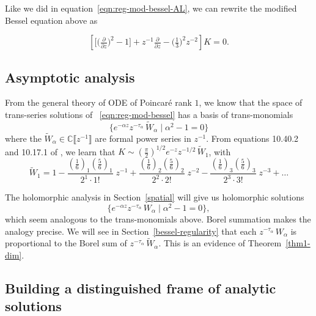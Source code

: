 \documentclass{article}
\theoremstyle{definition}
\newcommand{\C}{\mathbb{C}}
\newcommand{\series}[1]{\tilde{#1}}
\begin{document}
Like we did in equation~\eqref{eqn:reg-mod-bessel-AL}, we can rewrite the modified Bessel equation above as 

\begin{equation}\label{eqn:reg-mod-bessel}
\left[ \big[ \big(\tfrac{\partial}{\partial z}\big)^2 - 1 \big] + z^{-1} \tfrac{\partial}{\partial z} - \big(\tfrac{1}{3}\big)^2 z^{-2} \right] K = 0.
\end{equation}

\subsection{Asymptotic analysis}
From the general theory of ODE of Poincar\'e rank $1$, we know that the space of trans-series solutions of ~\eqref{eqn:reg-mod-bessel} has a basis of trans-monomials
\[ \{ e^{-\alpha z} z^{-\tau_\alpha}\,\series{W}_\alpha \mid \alpha^2 - 1 = 0 \} \]
where the $\series{W}_\alpha\in\C\llbracket z^{-1} \rrbracket$ are formal power series in $z^{-1}$. From equations 10.40.2 and 10.17.1 of \cite{dlmf}, we learn that $K \sim \left(\tfrac{\pi}{2}\right)^{1/2} e^{-z} z^{-1/2}\,\series{W}_1$, with
\begin{equation}\label{bessel-asymp}
\series{W}_1 = 1 - \frac{(\tfrac{1}{6})_1 (\tfrac{5}{6})_1}{2^1 \cdot 1!}\;z^{-1} + \frac{(\tfrac{1}{6})_2 (\tfrac{5}{6})_2}{2^2 \cdot 2!}\;z^{-2} - \frac{(\tfrac{1}{6})_3 (\tfrac{5}{6})_3}{2^3 \cdot 3!}\;z^{-3} + \ldots
\end{equation}

The holomorphic analysis in Section~\ref{spatial} will give us holomorphic solutions
\[ \{ e^{-\alpha z} z^{-\tau_\alpha}\,W_\alpha \mid \alpha^2 - 1 = 0 \}, \]
which seem analogous to the trans-monomials above. Borel summation makes the analogy precise. We will see in Section~\ref{bessel-regularity} that each $z^{-\tau_\alpha}\,W_\alpha$ is proportional to the Borel sum of $z^{-\tau_\alpha}\,\series{W}_\alpha$. This is an evidence of Theorem~\ref{thm1-dim}.

\subsection{Building a distinguished frame of analytic solutions}
\end{document}
